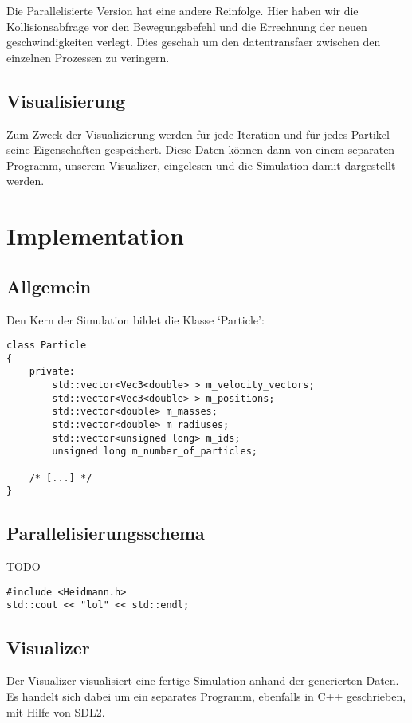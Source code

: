 Die Parallelisierte Version hat eine andere Reinfolge.
Hier haben wir die Kollisionsabfrage vor den Bewegungsbefehl und die Errechnung
der neuen geschwindigkeiten verlegt. Dies geschah um den datentransfaer zwischen
den einzelnen Prozessen zu veringern.

\subsection{Visualisierung}
Zum Zweck der Visualizierung werden für jede Iteration und für jedes Partikel seine
Eigenschaften gespeichert. Diese Daten können dann von einem separaten Programm,
unserem Visualizer, eingelesen und die Simulation damit dargestellt werden.


\section{Implementation}
\subsection{Allgemein}
Den Kern der Simulation bildet die Klasse `Particle':
\begin{verbatim}
class Particle
{
    private:
        std::vector<Vec3<double> > m_velocity_vectors;
        std::vector<Vec3<double> > m_positions;
        std::vector<double> m_masses;
        std::vector<double> m_radiuses;
        std::vector<unsigned long> m_ids;
        unsigned long m_number_of_particles;

    /* [...] */
}
\end{verbatim}

\subsection{Parallelisierungsschema}
TODO

\begin{verbatim}
#include <Heidmann.h>
std::cout << "lol" << std::endl;
\end{verbatim}


\subsection{Visualizer}
Der Visualizer visualisiert eine fertige Simulation anhand der generierten Daten.
Es handelt sich dabei um ein separates Programm, ebenfalls in C++ geschrieben,
mit Hilfe von SDL2.

